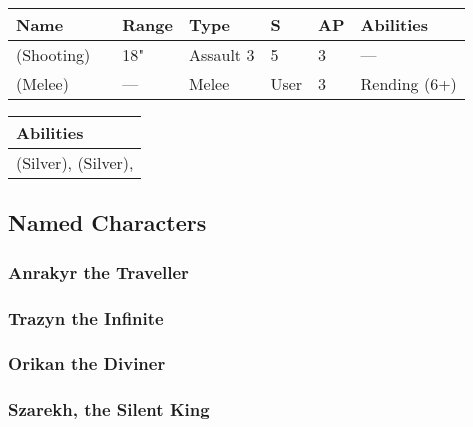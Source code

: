 \noindent
\begin{tabular}{||m{110pt} m{30pt} m{31pt} m{55pt} m{12pt} m{12pt} m{210pt}||}
	\hline
	Name & & Range & Type & S & AP & Abilities \\
	\hline
	\quickref{Staff of Light} (Shooting) & & 18" & Assault 3 & 5 & 3 & — \\
	\quickref{Staff of Light} (Melee) & & — & Melee & User & 3 & Rending (6+) \\
	\hline
\end{tabular}

\noindent
\begin{tabular}{||m{532pt}||}
	\hline
	Abilities \\
	\hline
	\quickref{Awakening Protocols}(Silver), \quickref{Nodal Command} (Silver), \quickref{Reanimation Protocols} \\
	\hline
\end{tabular}

\newpage
\subsection{Named Characters}

\subsubsection{Anrakyr the Traveller}

\newpage
\subsubsection{Trazyn the Infinite}

\newpage
\subsubsection{Orikan the Diviner}

\newpage
\subsubsection{Szarekh, the Silent King}